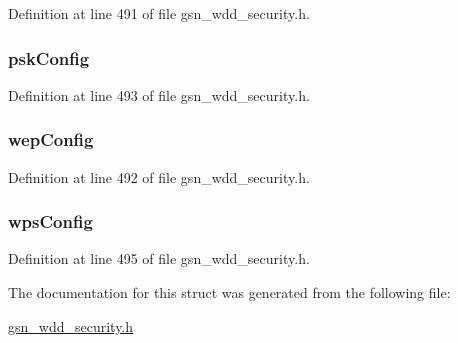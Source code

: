 Definition at line 491 of file gsn\_\-wdd\_\-security.h.

\hypertarget{a00297_a4f7d73999f35d675d76a167ed2ca4afb}{
\subsubsection[{pskConfig}]{ {\bf pskConfig}}}
\label{a00297_a4f7d73999f35d675d76a167ed2ca4afb}


Definition at line 493 of file gsn\_\-wdd\_\-security.h.

\hypertarget{a00297_ab32ca0d9b8cddea90b888dc1854fe971}{
\subsubsection[{wepConfig}]{ {\bf wepConfig}}}
\label{a00297_ab32ca0d9b8cddea90b888dc1854fe971}


Definition at line 492 of file gsn\_\-wdd\_\-security.h.

\hypertarget{a00297_ad2e086a3b4e51ed61f5504c96455732d}{
\subsubsection[{wpsConfig}]{ {\bf wpsConfig}}}
\label{a00297_ad2e086a3b4e51ed61f5504c96455732d}


Definition at line 495 of file gsn\_\-wdd\_\-security.h.



The documentation for this struct was generated from the following file:\begin{DoxyCompactItemize}
\item 
\hyperlink{a00604}{gsn\_\-wdd\_\-security.h}\end{DoxyCompactItemize}
